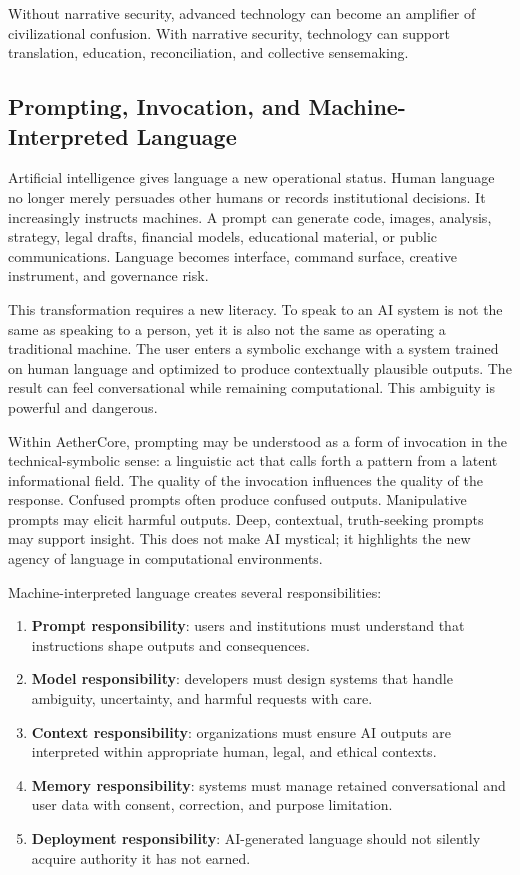 \documentclass[12pt]{article}
\begin{document}
Without narrative security, advanced technology can become an amplifier of civilizational confusion. With narrative security, technology can support translation, education, reconciliation, and collective sensemaking.

\subsection{Prompting, Invocation, and Machine-Interpreted Language}

Artificial intelligence gives language a new operational status. Human language no longer merely persuades other humans or records institutional decisions. It increasingly instructs machines. A prompt can generate code, images, analysis, strategy, legal drafts, financial models, educational material, or public communications. Language becomes interface, command surface, creative instrument, and governance risk.

This transformation requires a new literacy. To speak to an AI system is not the same as speaking to a person, yet it is also not the same as operating a traditional machine. The user enters a symbolic exchange with a system trained on human language and optimized to produce contextually plausible outputs. The result can feel conversational while remaining computational. This ambiguity is powerful and dangerous.

Within AetherCore, prompting may be understood as a form of invocation in the technical-symbolic sense: a linguistic act that calls forth a pattern from a latent informational field. The quality of the invocation influences the quality of the response. Confused prompts often produce confused outputs. Manipulative prompts may elicit harmful outputs. Deep, contextual, truth-seeking prompts may support insight. This does not make AI mystical; it highlights the new agency of language in computational environments.

Machine-interpreted language creates several responsibilities:

\begin{enumerate}
  \item \textbf{Prompt responsibility}: users and institutions must understand that instructions shape outputs and consequences.
  \item \textbf{Model responsibility}: developers must design systems that handle ambiguity, uncertainty, and harmful requests with care.
  \item \textbf{Context responsibility}: organizations must ensure AI outputs are interpreted within appropriate human, legal, and ethical contexts.
  \item \textbf{Memory responsibility}: systems must manage retained conversational and user data with consent, correction, and purpose limitation.
  \item \textbf{Deployment responsibility}: AI-generated language should not silently acquire authority it has not earned.
\end{enumerate}
\end{document}
